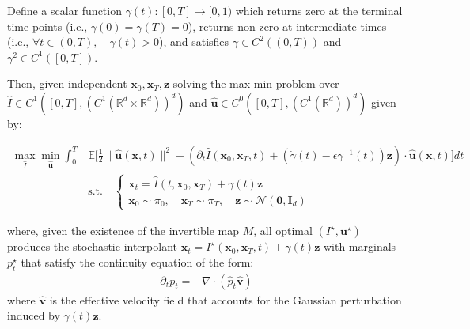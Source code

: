 \documentclass{article}
\begin{document}
\begin{proposition}\label{eq:sbp-stochastic-interpoalnts}
    Define a scalar function $\gamma(t):[0,T]\to[0,1)$ which returns zero at the terminal time points (i.e., $\gamma(0)=\gamma(T)=0$), returns non-zero at intermediate times (i.e., $\forall t\in (0,T), \quad \gamma(t)>0$), and satisfies $\gamma\in C^2((0,T))$ and $\gamma^2\in C^1([0,T] )$. 
    
    Then, given independent $\boldsymbol{x}_0, \boldsymbol{x}_T, \boldsymbol{z}$ solving the max-min problem over $\hat{I}\in C^1([0,T], (C^1(\mathbb{R}^d\times \mathbb{R}^d))^d)$ and $\hat{\boldsymbol{u}}\in C^0([0,T], (C^1(\mathbb{R}^d))^d)$ given by:
    \begin{small}
    \begin{align}
        \underset{\hat{I}}{\max}\underset{\hat{\boldsymbol{u}}}{\min}\int_0^T&\mathbb{E}\bigg[\frac{1}{2}\|\hat{\boldsymbol{u}}(\boldsymbol{x},t)\|^2-\left(\partial_t\hat{I}(\boldsymbol{x}_0, \boldsymbol{x}_T,t)+\left(\dot{\gamma}(t)-\epsilon\gamma^{-1}(t)\right)\boldsymbol{z}\right)\cdot \hat{\boldsymbol{u}}(\boldsymbol{x},t)\bigg]dt\label{eq:max-min-orig}\\
        &\text{s.t.}\quad \begin{cases}
            \boldsymbol{x}_t=\hat{I}(t, \boldsymbol{x}_0, \boldsymbol{x}_T)+\gamma(t)\boldsymbol{z}\\
            \boldsymbol{x}_0\sim \pi_0, \quad \boldsymbol{x}_T\sim \pi_T, \quad \boldsymbol{z}\sim \mathcal{N}(\boldsymbol{0}, \boldsymbol{I}_d)
        \end{cases}
    \end{align}
    \end{small}
    where, given the existence of the invertible map $M$, all optimal $(I^\star, \boldsymbol{u}^\star)$ produces the stochastic interpolant $\boldsymbol{x}_t=I^\star(\boldsymbol{x}_0, \boldsymbol{x}_T,t)+\gamma(t)\boldsymbol{z}$ with marginals $p_t^\star$ that satisfy the continuity equation of the form:
    \begin{align}
        \partial_tp_t=-\nabla \cdot(\hat{p}_t\hat{\boldsymbol{v}})
    \end{align}
    where $\hat{\boldsymbol{v}}$ is the effective velocity field that accounts for the Gaussian perturbation induced by $\gamma(t)\boldsymbol{z}$. 
\end{proposition}
\end{document}
